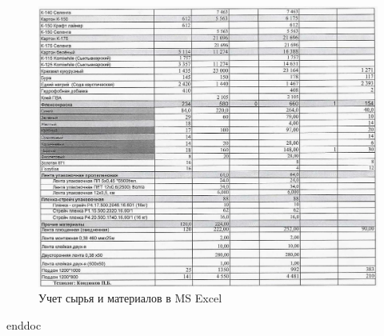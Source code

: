 \begin{figure}
\begin{center}
  \includegraphics[height=0.6\textheight, angle=90, keepaspectratio]{Pics 1/1.9 отчет о расходе сырья и материалов 2_0001.jpg}
\end{center}
  \caption{Учет сырья и материалов в MS Excel}
  \label{pic:1.9 отчет о расходе сырья и материалов 2_0001}
\end{figure}
\clearpage
%
\clearpage
 {enddoc}